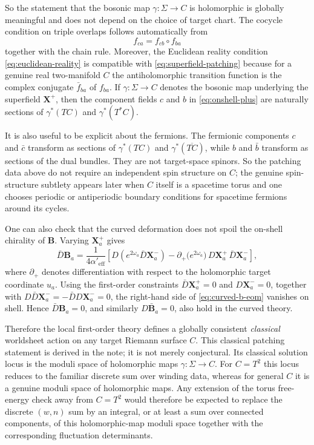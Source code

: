 \documentclass[11pt]{article}
\newcommand{\Aeff}{\alpha'_{\mathrm{eff}}}
\begin{document}
So the statement that the bosonic map $\gamma:\Sigma\to C$ is holomorphic is globally meaningful and does not depend on the choice of target chart.
The cocycle condition on triple overlaps follows automatically from
\begin{equation}\label{eq:cocycle}
f_{ca}=f_{cb}\circ f_{ba}
\end{equation}
together with the chain rule. Moreover, the Euclidean reality condition \eqref{eq:euclidean-reality} is compatible with \eqref{eq:superfield-patching} because for a genuine real two-manifold $C$ the antiholomorphic transition function is the complex conjugate $\bar f_{ba}$ of $f_{ba}$. If $\gamma:\Sigma\to C$ denotes the bosonic map underlying the superfield $\mathbf X^+$, then the component fields $c$ and $b$ in \eqref{eq:onshell-plus} are naturally sections of $\gamma^*(TC)$ and $\gamma^*(T^*C)$.

It is also useful to be explicit about the fermions. The fermionic components $c$ and $\bar c$ transform as sections of $\gamma^*(TC)$ and $\gamma^*(\overline{TC})$, while $b$ and $\bar b$ transform as sections of the dual bundles. They are not target-space spinors. So the patching data above do not require an independent spin structure on $C$; the genuine spin-structure subtlety appears later when $C$ itself is a spacetime torus and one chooses periodic or antiperiodic boundary conditions for spacetime fermions around its cycles.

One can also check that the curved deformation does not spoil the on-shell chirality of $\mathbf B$. Varying $\mathbf X^+_a$ gives
\begin{equation}\label{eq:curved-b-eom}
\bar D\mathbf B_a
=
\frac{1}{4\Aeff}
\left[
D\!\left(e^{2\omega_a}\bar D\mathbf X^-_a\right)
-\partial_{+}\!\big(e^{2\omega_a}\big)\,D\mathbf X^+_a\,\bar D\mathbf X^-_a
\right],
\end{equation}
where $\partial_+$ denotes differentiation with respect to the holomorphic target coordinate $u_a$. Using the first-order constraints $\bar D\mathbf X^+_a=0$ and $D\mathbf X^-_a=0$, together with $D\bar D\mathbf X^-_a=-\bar DD\mathbf X^-_a=0$, the right-hand side of \eqref{eq:curved-b-eom} vanishes on shell. Hence $\bar D\mathbf B_a=0$, and similarly $D\bar{\mathbf B}_a=0$, also hold in the curved theory.

Therefore the local first-order theory defines a globally consistent \emph{classical} worldsheet action on any target Riemann surface $C$. This classical patching statement is derived in the note; it is not merely conjectural. Its classical solution locus is the moduli space of holomorphic maps $\gamma:\Sigma\to C$. For $C=T^2$ this locus reduces to the familiar discrete sum over winding data, whereas for general $C$ it is a genuine moduli space of holomorphic maps. Any extension of the torus free-energy check away from $C=T^2$ would therefore be expected to replace the discrete $(w,n)$ sum by an integral, or at least a sum over connected components, of this holomorphic-map moduli space together with the corresponding fluctuation determinants.
\end{document}
